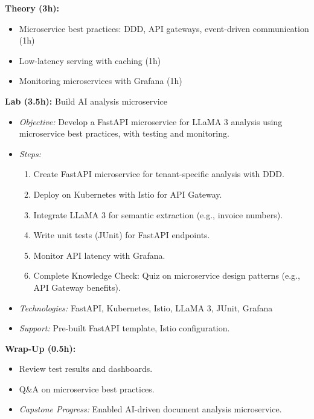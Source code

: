 \documentclass[11pt]{article}
\begin{document}
\textbf{Theory (3h):}
\begin{itemize}
    \item Microservice best practices: DDD, API gateways, event-driven communication (1h)
    \item Low-latency serving with caching (1h)
    \item Monitoring microservices with Grafana (1h)
\end{itemize}
\textbf{Lab (3.5h):} Build AI analysis microservice
\begin{itemize}
    \item \textit{Objective:} Develop a FastAPI microservice for LLaMA 3 analysis using microservice best practices, with testing and monitoring.
    \item \textit{Steps:}
        \begin{enumerate}
            \item Create FastAPI microservice for tenant-specific analysis with DDD.
            \item Deploy on Kubernetes with Istio for API Gateway.
            \item Integrate LLaMA 3 for semantic extraction (e.g., invoice numbers).
            \item Write unit tests (JUnit) for FastAPI endpoints.
            \item Monitor API latency with Grafana.
            \item Complete Knowledge Check: Quiz on microservice design patterns (e.g., API Gateway benefits).
        \end{enumerate}
    \item \textit{Technologies:} FastAPI, Kubernetes, Istio, LLaMA 3, JUnit, Grafana
    \item \textit{Support:} Pre-built FastAPI template, Istio configuration.
\end{itemize}
\textbf{Wrap-Up (0.5h):}
\begin{itemize}
    \item Review test results and dashboards.
    \item Q\&A on microservice best practices.
    \item \textit{Capstone Progress:} Enabled AI-driven document analysis microservice.
\end{itemize}
\end{document}
